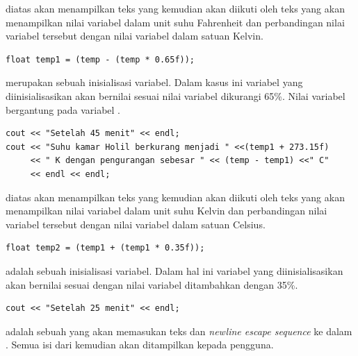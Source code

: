 \documentclass[../main.tex]{subfiles}
\begin{document}
    \ilz{}{\Script} diatas akan menampilkan teks  yang kemudian akan diikuti oleh teks yang akan menampilkan nilai variabel  dalam unit suhu Fahrenheit dan perbandingan nilai variabel tersebut dengan nilai variabel  dalam satuan Kelvin.

\begin{lstlisting}
float temp1 = (temp - (temp * 0.65f));
\end{lstlisting}

    \ilz{}{\Script}  merupakan sebuah {\statement} inisialisasi variabel. Dalam kasus ini variabel yang diinisialisasikan akan bernilai sesuai nilai variabel  dikurangi 65\%. Nilai variabel  bergantung pada variabel .

\begin{lstlisting}
cout << "Setelah 45 menit" << endl;
cout << "Suhu kamar Holil berkurang menjadi " <<(temp1 + 273.15f)
     << " K dengan pengurangan sebesar " << (temp - temp1) <<" C"
     << endl << endl;
\end{lstlisting}

    \ilz{}{\Script} diatas akan menampilkan teks  yang kemudian akan diikuti oleh teks yang akan menampilkan nilai variabel  dalam unit suhu Kelvin dan perbandingan nilai variabel tersebut dengan nilai variabel  dalam satuan Celsius.

\begin{lstlisting}
float temp2 = (temp1 + (temp1 * 0.35f));
\end{lstlisting}

    \ilz{}{\Script}  adalah sebuah {\statement} inisialisasi variabel. Dalam hal ini variabel yang diinisialisasikan akan bernilai sesuai dengan nilai variabel  ditambahkan dengan 35\%.

\begin{lstlisting}
cout << "Setelah 25 menit" << endl;
\end{lstlisting}

    \ilz{}{\Script}  adalah sebuah {\statement} yang akan memasukan teks  dan \textit{newline escape sequence} ke dalam {\ioo} {\stream}. Semua isi dari {\ioo} {\stream} kemudian akan ditampilkan kepada pengguna.
\end{document}
